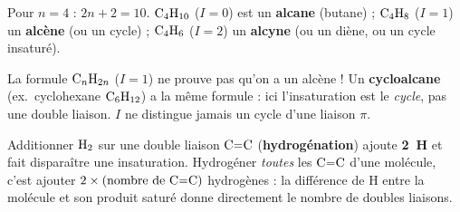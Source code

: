 \documentclass[11pt,a4paper]{article}
\begin{document}
\begin{exemplebox}[$\ce{C4H10}$, $\ce{C4H8}$, $\ce{C4H6}$]
Pour $n=4$ : $2n+2=10$. \;$\ce{C4H10}$ ($I=0$) est un \textbf{alcane} (butane) ; $\ce{C4H8}$ ($I=1$) un \textbf{alcène} (ou un cycle) ; $\ce{C4H6}$ ($I=2$) un \textbf{alcyne} (ou un diène, ou un cycle insaturé).
\end{exemplebox}

\begin{piege}
La formule $\ce{C_nH_{2n}}$ ($I=1$) ne prouve pas qu'on a un alcène ! Un \textbf{cycloalcane} (ex.\ cyclohexane $\ce{C6H12}$) a la même formule : ici l'insaturation est le \emph{cycle}, pas une double liaison. $I$ ne distingue jamais un cycle d'une liaison $\pi$.
\end{piege}

\begin{remarque}
Additionner $\ce{H2}$ sur une double liaison $\ce{C=C}$ (\textbf{hydrogénation}) ajoute \textbf{2~H} et fait disparaître une insaturation. Hydrogéner \emph{toutes} les $\ce{C=C}$ d'une molécule, c'est ajouter $2\times(\text{nombre de }\ce{C=C})$ hydrogènes : la différence de H entre la molécule et son produit saturé donne directement le nombre de doubles liaisons.
\end{remarque}
\end{document}
